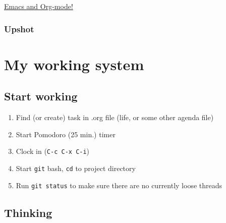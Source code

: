 \documentclass[11pt]{article}
\begin{document}
\href{http://orgmode.org/}{Emacs and Org-mode!}
\subsubsection{Upshot}
\label{sec-3-3-4}
\section{My working system}
\label{sec-4}
\subsection{Start working}
\label{sec-4-1}

\begin{enumerate}
\item Find (or create) task in .org file (life, or some other agenda file)
\item Start Pomodoro (25 min.) timer
\item Clock in (\texttt{C-c C-x C-i})
\item Start \texttt{git} bash, \texttt{cd} to project directory
\item Run \texttt{git status} to make sure there are no currently loose threads
\end{enumerate}
\subsection{Thinking}
\label{sec-4-2}
\end{document}
